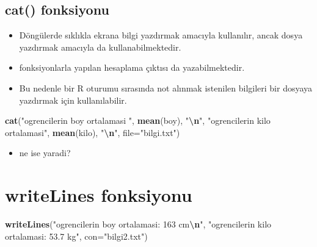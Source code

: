 \documentclass[
  oneside]{book}
\newenvironment{Shaded}{\begin{snugshade}}{\end{snugshade}}
\newcommand{\AttributeTok}[1]{\textcolor[rgb]{0.13,0.29,0.53}{#1}}
\newcommand{\FunctionTok}[1]{\textcolor[rgb]{0.13,0.29,0.53}{\textbf{#1}}}
\newcommand{\NormalTok}[1]{#1}
\newcommand{\SpecialCharTok}[1]{\textcolor[rgb]{0.81,0.36,0.00}{\textbf{#1}}}
\newcommand{\StringTok}[1]{\textcolor[rgb]{0.31,0.60,0.02}{#1}}
\providecommand{\tightlist}{%
  \setlength{\itemsep}{0pt}\setlength{\parskip}{0pt}}
\begin{document}
\hypertarget{cat-fonksiyonu}{%
\subsection{\texorpdfstring{\textbf{cat()} fonksiyonu}{cat() fonksiyonu}}\label{cat-fonksiyonu}}

\begin{itemize}
\tightlist
\item
  Döngülerde sıklıkla ekrana bilgi yazdırmak amacıyla kullanılır, ancak dosya yazdırmak amacıyla da kullanabilmektedir.
\item
  fonksiyonlarla yapılan hesaplama çıktısı da yazabilmektedir.
\item
  Bu nedenle bir R oturumu sırasında not alınmak istenilen bilgileri bir dosyaya yazdırmak için kullanılabilir.
\end{itemize}

\begin{Shaded}
\begin{Highlighting}[]
 \FunctionTok{cat}\NormalTok{(}\StringTok{"ogrencilerin boy ortalamasi "}\NormalTok{, }\FunctionTok{mean}\NormalTok{(boy), }\StringTok{"}\SpecialCharTok{\textbackslash{}n}\StringTok{"}\NormalTok{,}
      \StringTok{"ogrencilerin kilo ortalamasi"}\NormalTok{, }\FunctionTok{mean}\NormalTok{(kilo), }\StringTok{"}\SpecialCharTok{\textbackslash{}n}\StringTok{"}\NormalTok{,}
     \AttributeTok{file=}\StringTok{"bilgi.txt"}\NormalTok{)}
\end{Highlighting}
\end{Shaded}

\begin{itemize}
\tightlist
\item
  \n ne ise yaradi?
\end{itemize}

\hypertarget{writelines-fonksiyonu}{%
\section{writeLines fonksiyonu}\label{writelines-fonksiyonu}}

\begin{Shaded}
\begin{Highlighting}[]
\FunctionTok{writeLines}\NormalTok{(}\StringTok{"ogrencilerin boy ortalamasi: 163 cm}\SpecialCharTok{\textbackslash{}n}\StringTok{"}\NormalTok{,}
            \StringTok{"ogrencilerin kilo ortalamasi: 53.7 kg"}\NormalTok{,}
            \AttributeTok{con=}\StringTok{"bilgi2.txt"}\NormalTok{)}
\end{Highlighting}
\end{Shaded}
\end{document}
